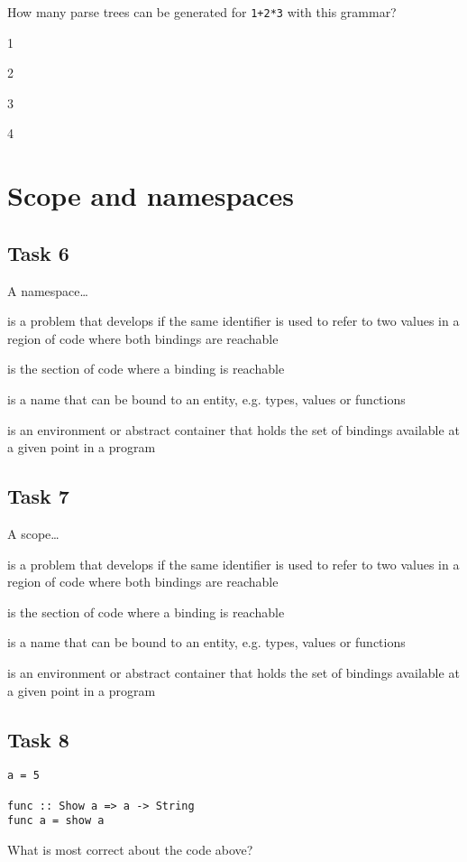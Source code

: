 \documentclass{article}
\begin{document}
How many parse trees can be generated for \texttt{1+2*3} with this grammar?
\newline

\begin{deloppgaver}
    \item 1
    \item 2
    \item 3
    \item 4
\end{deloppgaver}

\section{Scope and namespaces}
\subsection*{Task 6}
A namespace\ldots
\begin{deloppgaver}
    \item is a problem that develops if the same identifier is used to refer to two values in a region of code where both bindings are reachable
    \item is the section of code where a binding is reachable
    \item is a name that can be bound to an entity, e.g. types, values or functions
    \item is an environment or abstract container that holds the set of bindings available at a given point in a program
\end{deloppgaver}

\subsection*{Task 7}
A scope\ldots
\begin{deloppgaver}
    \item is a problem that develops if the same identifier is used to refer to two values in a region of code where both bindings are reachable
    \item is the section of code where a binding is reachable
    \item is a name that can be bound to an entity, e.g. types, values or functions
    \item is an environment or abstract container that holds the set of bindings available at a given point in a program
\end{deloppgaver}

\subsection*{Task 8}
\begin{lstlisting}
a = 5

func :: Show a => a -> String
func a = show a
\end{lstlisting}
What is most correct about the code above?
\newline
\end{document}
